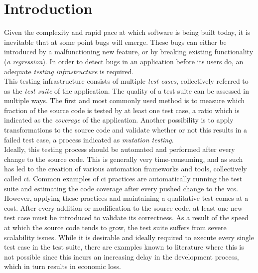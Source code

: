 
\chapter{Introduction}
\label{ch:introduction}
Given the complexity and rapid pace at which software is being built today, it is inevitable that at some point bugs will emerge. These bugs can either be introduced by a malfunctioning new feature, or by breaking existing functionality (\emph{a regression}). In order to detect bugs in an application before its users do, an adequate \emph{testing infrastructure} is required.\\

\noindent This testing infrastructure consists of multiple \emph{test cases}, collectively referred to as the \emph{test suite} of the application. The quality of a test suite can be assessed in multiple ways. The first and most commonly used method is to measure which fraction of the source code is tested by at least one test case, a ratio which is indicated as the \emph{coverage} of the application. Another possibility is to apply transformations to the source code and validate whether or not this results in a failed test case, a process indicated as \emph{mutation testing}.\\

\noindent Ideally, this testing process should be automated and performed after every change to the source code. This is generally very time-consuming, and as such has led to the creation of various automation frameworks and tools, collectively called \acrfull{ci}. Common examples of \acrshort{ci} practices are automatically running the test suite and estimating the code coverage after every pushed change to the \acrfull{vcs}.\\

\noindent However, applying these practices and maintaining a qualitative test comes at a cost. After every addition or modification to the source code, at least one new test case must be introduced to validate its correctness. As a result of the speed at which the source code tends to grow, the test suite suffers from severe scalability issues. While it is desirable and ideally required to execute every single test case in the test suite, there are examples known to literature where this is not possible since this incurs an increasing delay in the development process, which in turn results in economic loss.\\

